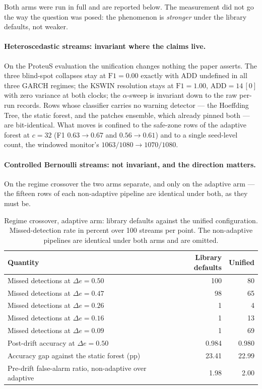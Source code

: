 Both arms were run in full and are reported below. The measurement did not go the way the question
was posed: the phenomenon is \emph{stronger} under the library defaults, not weaker.

\paragraph{Heteroscedastic streams: invariant where the claims live.}
On the ProteuS evaluation the unification changes nothing the paper asserts. The three blind-spot
collapses stay at $\mathrm{F1} = 0.00$ exactly with $\mathrm{ADD}$ undefined in all three GARCH
regimes; the KSWIN resolution stays at $\mathrm{F1} = 1.00$, $\mathrm{ADD} = 14\,[0]$ with zero
variance at both clocks; the $\alpha$-sweep is invariant down to the raw per-run records. Rows
whose classifier carries no warning detector --- the Hoeffding Tree, the static forest, and the
patches ensemble, which already pinned both --- are bit-identical. What moves is confined to the
safe-zone rows of the adaptive forest at $c = 32$ (F1 $0.63 \to 0.67$ and $0.56 \to 0.61$) and to a
single seed-level count, the windowed monitor's $1063/1080 \to 1070/1080$.

\paragraph{Controlled Bernoulli streams: not invariant, and the direction matters.}
On the regime crossover the two arms separate, and only on the adaptive arm --- the fifteen rows of
each non-adaptive pipeline are identical under both, as they must be.

\begin{table}[t]
  \centering
  \caption{Regime crossover, adaptive arm: library defaults against the unified configuration.
  Missed-detection rate in percent over 100 streams per point. The non-adaptive pipelines are
  identical under both arms and are omitted.}
  \label{tab:protocol_arm_r3}
  \begin{tabular}{@{}lrr@{}}
    \toprule
    \textbf{Quantity} & \textbf{Library defaults} & \textbf{Unified} \\
    \midrule
    Missed detections at $\Delta e = 0.50$ & 100 & 80 \\
    Missed detections at $\Delta e = 0.47$ & 98  & 65 \\
    Missed detections at $\Delta e = 0.26$ & 1   & 4  \\
    Missed detections at $\Delta e = 0.16$ & 1   & 13 \\
    Missed detections at $\Delta e = 0.09$ & 1   & 69 \\
    \midrule
    Post-drift accuracy at $\Delta e = 0.50$ & 0.984 & 0.980 \\
    Accuracy gap against the static forest (pp) & 23.41 & 22.99 \\
    Pre-drift false-alarm ratio, non-adaptive over adaptive & 1.98 & 2.00 \\
    \bottomrule
  \end{tabular}
\end{table}

